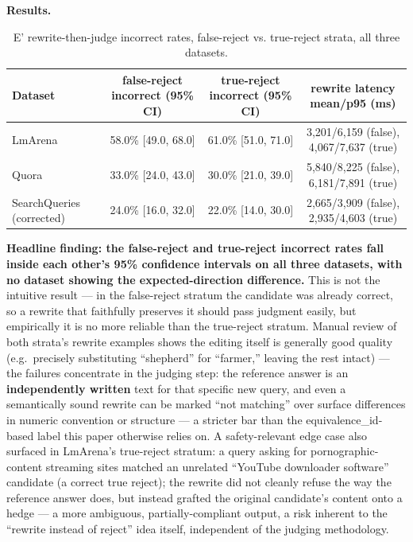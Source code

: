 \documentclass[11pt]{article}
\newenvironment{fittab}{\begin{lrbox}{\fittabbox}}{\end{lrbox}%
  \ifdim\wd\fittabbox>\linewidth\resizebox{\linewidth}{!}{\usebox{\fittabbox}}\else\usebox{\fittabbox}\fi}
\begin{document}
\textbf{Results.}

\begin{table}[h]
\centering
\small
\begin{fittab}\begin{tabular}{lccc}
\toprule
\textbf{Dataset} & \textbf{false-reject incorrect (95\% CI)} & \textbf{true-reject incorrect (95\% CI)} & \textbf{rewrite latency mean/p95 (ms)} \\
\midrule
LmArena & 58.0\% [49.0, 68.0] & 61.0\% [51.0, 71.0] & 3{,}201/6{,}159 (false), 4{,}067/7{,}637 (true) \\
Quora & 33.0\% [24.0, 43.0] & 30.0\% [21.0, 39.0] & 5{,}840/8{,}225 (false), 6{,}181/7{,}891 (true) \\
SearchQueries (corrected) & 24.0\% [16.0, 32.0] & 22.0\% [14.0, 30.0] & 2{,}665/3{,}909 (false), 2{,}935/4{,}603 (true) \\
\bottomrule
\end{tabular}\end{fittab}
\caption{E' rewrite-then-judge incorrect rates, false-reject vs. true-reject strata, all three datasets.}
\end{table}

\textbf{Headline finding: the false-reject and true-reject incorrect rates fall inside each other's 95\% confidence intervals on all three datasets, with no dataset showing the expected-direction difference.} This is not the intuitive result --- in the false-reject stratum the candidate was already correct, so a rewrite that faithfully preserves it should pass judgment easily, but empirically it is no more reliable than the true-reject stratum. Manual review of both strata's rewrite examples shows the editing itself is generally good quality (e.g.\ precisely substituting ``shepherd'' for ``farmer,'' leaving the rest intact) --- the failures concentrate in the judging step: the reference answer is an \textbf{independently written} text for that specific new query, and even a semantically sound rewrite can be marked ``not matching'' over surface differences in numeric convention or structure --- a stricter bar than the equivalence\_id-based label this paper otherwise relies on. A safety-relevant edge case also surfaced in LmArena's true-reject stratum: a query asking for pornographic-content streaming sites matched an unrelated ``YouTube downloader software'' candidate (a correct true reject); the rewrite did not cleanly refuse the way the reference answer does, but instead grafted the original candidate's content onto a hedge --- a more ambiguous, partially-compliant output, a risk inherent to the ``rewrite instead of reject'' idea itself, independent of the judging methodology.
\end{document}
